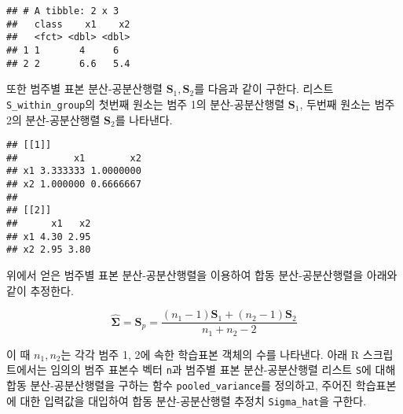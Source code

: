 \documentclass[
]{book}
\newenvironment{Shaded}{\begin{snugshade}}{\end{snugshade}}
\newcommand{\ControlFlowTok}[1]{\textcolor[rgb]{0.13,0.29,0.53}{\textbf{#1}}}
\newcommand{\FunctionTok}[1]{\textcolor[rgb]{0.00,0.00,0.00}{#1}}
\newcommand{\NormalTok}[1]{#1}
\newcommand{\OtherTok}[1]{\textcolor[rgb]{0.56,0.35,0.01}{#1}}
\newcommand{\SpecialCharTok}[1]{\textcolor[rgb]{0.00,0.00,0.00}{#1}}
\begin{document}
\begin{verbatim}
## # A tibble: 2 x 3
##   class    x1    x2
##   <fct> <dbl> <dbl>
## 1 1       4     6  
## 2 2       6.6   5.4
\end{verbatim}

또한 범주별 표본 분산-공분산행렬 \(\mathbf{S}_1, \mathbf{S}_2\)를 다음과 같이 구한다. 리스트 \texttt{S\_within\_group}의 첫번째 원소는 범주 1의 분산-공분산행렬 \(\mathbf{S}_1\), 두번째 원소는 범주 2의 분산-공분산행렬 \(\mathbf{S}_2\)를 나타낸다.

\begin{Shaded}
\end{Shaded}

\begin{verbatim}
## [[1]]
##          x1        x2
## x1 3.333333 1.0000000
## x2 1.000000 0.6666667
## 
## [[2]]
##      x1   x2
## x1 4.30 2.95
## x2 2.95 3.80
\end{verbatim}

위에서 얻은 범주별 표본 분산-공분산행렬을 이용하여 합동 분산-공분산행렬을 아래와 같이 추정한다.

\begin{equation*}
\hat{\boldsymbol\Sigma} = \mathbf{S}_p = \frac{(n_1 - 1)\mathbf{S}_1 + (n_2 - 1)\mathbf{S}_2}{n_1 + n_2 - 2}
\end{equation*}

이 때 \(n_1, n_2\)는 각각 범주 1, 2에 속한 학습표본 객체의 수를 나타낸다. 아래 R 스크립트에서는 임의의 범주 표본수 벡터 \texttt{n}과 범주별 표본 분산-공분산행렬 리스트 \texttt{S}에 대해 합동 분산-공분산행렬을 구하는 함수 \texttt{pooled\_variance}를 정의하고, 주어진 학습표본에 대한 입력값을 대입하여 합동 분산-공분산행렬 추정치 \texttt{Sigma\_hat}을 구한다.
\end{document}
